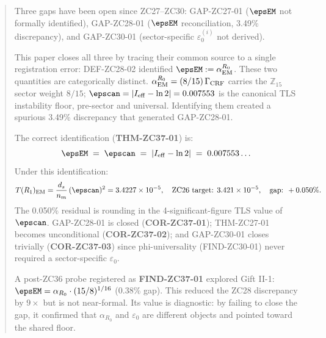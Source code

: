 \documentclass[12pt, a4paper]{article}
\begin{document}


\sloppy


\begin{abstract}
\sloppy
Three gaps have been open since ZC27--ZC30:
GAP-ZC27-01 ($\epsEM$ not formally identified),
GAP-ZC28-01 ($\epsEM$ reconciliation, 3.49\% discrepancy), and
GAP-ZC30-01 (sector-specific $\varepsilon_0^{(i)}$ not derived).

This paper closes all three by tracing their common source to a
single registration error: DEF-ZC28-02 identified
$\epsEM := \alpha_{\rm EM}^{R_0}$.
These two quantities are categorically distinct.
$\alpha_{\rm EM}^{R_0} = (8/15)\,\Gamma_{\rm CRF}$ carries the
$\mathbb{Z}_{15}$ sector weight $8/15$;
$\epscan = |I_{\rm eff} - \ln 2| = 0.007553$ is the canonical
TLS instability floor, pre-sector and universal.
Identifying them created a spurious 3.49\% discrepancy that
generated GAP-ZC28-01.

The correct identification (\textbf{THM-ZC37-01}) is:
\[
  \epsEM \;=\; \epscan \;=\; |I_{\rm eff} - \ln 2| \;=\; 0.007553\ldots
\]
Under this identification:
\[
  T(R_1)_{\rm EM}
    = \frac{d_s}{n_m}\,(\epscan)^2
    = 3.4227\times10^{-5},
  \quad \text{ZC26 target: } 3.421\times10^{-5},
  \quad \text{gap: } +0.050\%.
\]
The 0.050\% residual is rounding in the 4-significant-figure
TLS value of $\epscan$. GAP-ZC28-01 is closed
(\textbf{COR-ZC37-01}); THM-ZC27-01 becomes unconditional
(\textbf{COR-ZC37-02}); and GAP-ZC30-01 closes trivially
(\textbf{COR-ZC37-03}) since phi-universality (FIND-ZC30-01)
never required a sector-specific $\varepsilon_0$.

A post-ZC36 probe registered as \textbf{FIND-ZC37-01} explored
Gift II-1: $\epsEM = \alpha_{R_0}\cdot(15/8)^{1/16}$ (0.38\%
gap). This reduced the ZC28 discrepancy by $9\times$ but is not
near-formal. Its value is diagnostic: by failing to close the
gap, it confirmed that $\alpha_{R_0}$ and $\varepsilon_0$ are
different objects and pointed toward the shared floor.


\end{abstract}
\end{document}
